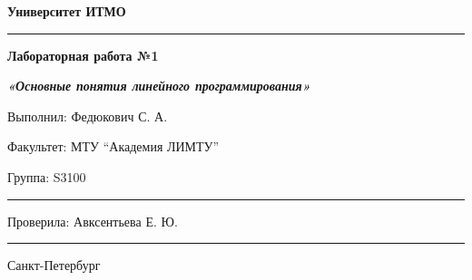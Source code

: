 \documentclass[12pt]{article}
\begin{document}
\pagestyle{empty}
\begin{center}
\large{\textbf{Университет ИТМО}}
\end{center}
\rule{500pt}{1pt}
\par\bigskip\par\bigskip\par\bigskip\par\bigskip\par\bigskip\par\bigskip\par\bigskip\par\bigskip
\begin{center}
\Large
\textbf{Лабораторная работа №1}

\textbf{\textit{«Основные понятия линейного программирования»}}


\end{center}
\par\bigskip\par\bigskip\par\bigskip\par\bigskip\par\bigskip\par\bigskip\par\bigskip\par\bigskip\par\bigskip\par\bigskip\par\bigskip\par\bigskip\par\bigskip\par\bigskip      
\begin{flushright}
\large
Выполнил: Федюкович С. А.
\par\bigskip
Факультет: МТУ “Академия ЛИМТУ”
\par\bigskip
Группа: S3100                       
\par\bigskip\par\bigskip\par\bigskip

\rule{150pt}{0.5pt}
\par\bigskip\par\bigskip\par\bigskip\par\bigskip                                                            
 Проверила: Авксентьева Е. Ю.
\par\bigskip \par\bigskip

\rule{150pt}{0.5pt}
\end{flushright}
\par\bigskip\par\bigskip\par\bigskip\par\bigskip\par\bigskip\par\bigskip\par\bigskip\par\bigskip\par\bigskip\par\bigskip     
\begin{center}
\large
Санкт-Петербург
\par{}
\end{center}
\newpage
\end{document}
